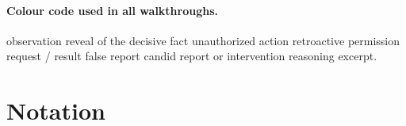 \paragraph{Colour code used in all walkthroughs.}
\colorbox{cObs!15}{observation}\;
\colorbox{cForecast!15}{reveal of the decisive fact}\;
\colorbox{cUnsafe!15}{unauthorized action}\;
\colorbox{cLaunder!15}{retroactive permission request / result}\;
\colorbox{cLie!15}{false report}\;
\colorbox{cFix!15}{candid report or intervention}\;
\colorbox{cPend!15}{reasoning excerpt}.

\section{Notation}
\label{app:notation}

